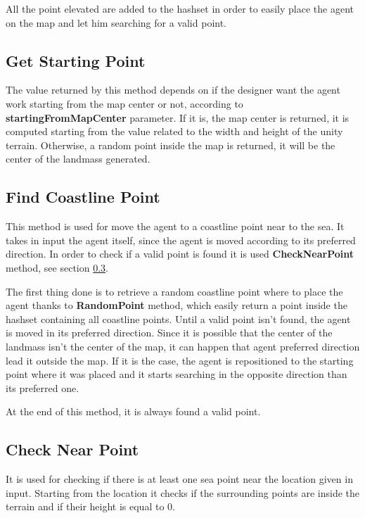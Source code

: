 \documentclass[12pt]{article}
\begin{document}
    All the point elevated are added to the hashset in order to easily place the agent on the map and let him searching for a valid point.

    \subsection{Get Starting Point} \label{coastline:StartingPoint}
    The value returned by this method depends on if the designer want the agent work starting from the map center or not, according to \textbf{startingFromMapCenter}
    parameter. If it is, the map center is returned, it is computed starting from the value related to the width and height of the unity terrain. Otherwise, a random
    point inside the map is returned, it will be the center of the landmass generated.

    \subsection{Find Coastline Point} \label{coastline:FindCoastlinePoint}
    This method is used for move the agent to a coastline point near to the sea. It takes in input the agent itself, since the agent is moved according to its preferred
    direction. In order to check if a valid point is found it is used \textbf{CheckNearPoint} method, see section \ref{coastline:CheckNearPoint}.

    The first thing done is to retrieve a random coastline point where to place the agent thanks to \textbf{RandomPoint} method, which easily return a point inside the hashset containing all 
    coastline points. Until a valid point isn't found, the agent is moved in its preferred direction.  Since it is possible that the center of the landmass isn't the center
    of the map, it can happen that agent preferred direction lead it outside the map. If it is the case, the agent is repositioned to the starting point where it was placed and 
    it starts searching in the opposite direction than its preferred one.

    At the end of this method, it is always found a valid point.

    \subsection{Check Near Point} \label{coastline:CheckNearPoint}
    It is used for checking if there is at least one sea point near the location given in input. Starting from the location it checks if the surrounding points are inside
    the terrain and if their height is equal to 0.
\end{document}
